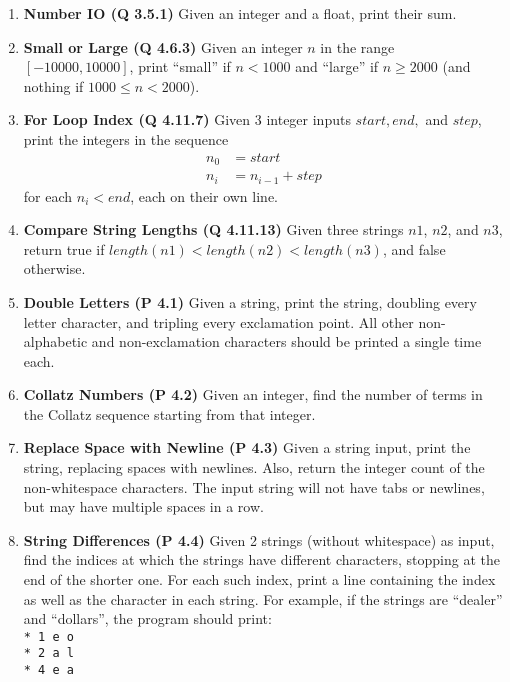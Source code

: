 \documentclass{sig-alternate}
\begin{document}
\begin{enumerate}
\item
\textbf{Number IO (Q 3.5.1)}
Given an integer and a float, print their sum.

\item
\textbf{Small or Large (Q 4.6.3)}
Given an integer $n$ in the range $[-10000, 10000]$, print ``small'' if $n < 1000$ and ``large'' if $n \ge 2000$ (and nothing if $1000 \le n < 2000$).

\item
\textbf{For Loop Index (Q 4.11.7)}
Given 3 integer inputs $start, end,$ and $step$, print the integers in the sequence
\begin{align*}
n_0 &= start \\
n_i &= n_{i-1} + step
\end{align*}
for each $n_i < end$, each on their own line.

\item
\textbf{Compare String Lengths (Q 4.11.13)}
Given three strings $n1$, $n2$, and $n3$, return true if $length(n1) < length(n2) < length(n3)$, and false otherwise.

\item
\textbf{Double Letters (P 4.1)}
Given a string, print the string, doubling every letter character, and tripling every exclamation point. All other non-alphabetic and non-exclamation characters should be printed a single time each.

\item
\textbf{Collatz Numbers (P 4.2)}
Given an integer, find the number of terms in the Collatz sequence starting from that integer.

\item
\textbf{Replace Space with Newline (P 4.3)}
Given a string input, print the string, replacing spaces with newlines. Also, return the integer count of the non-whitespace characters. The input string will not have tabs or newlines, but may have multiple spaces in a row.

\item
\textbf{String Differences (P 4.4)}
Given 2 strings (without whitespace) as input, find the indices at which the strings have different characters, stopping at the end of the shorter one. For each such index, print a line containing the index as well as the character in each string. For example, if the strings are ``dealer'' and ``dollars'', the program should print:
\texttt{\\*
\hspace*{1cm}1 e o \\*
\hspace*{1cm}2 a l \\*
\hspace*{1cm}4 e a
}


\end{enumerate}
\end{document}
